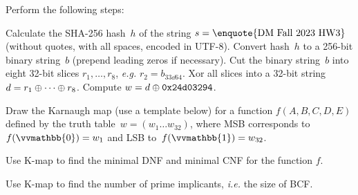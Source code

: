 \documentclass[a4paper,12pt]{article}
\begin{document}

\begin{tasks}
    \item Perform the following steps:
    \begin{subtasks}
        \item Calculate the SHA-256 hash~$h$ of the string $s = \text{\enquote{DM Fall 2023 HW3}}$ (without quotes, with all spaces, encoded in UTF-8).
        Convert hash~$h$ to a 256-bit binary string~$b$ (prepend leading zeros if necessary).
        Cut the binary string~$b$ into eight 32-bit slices $r_1, \dotsc, r_8$, \textit{e.g.} $r_2 = b_{33 \dd 64}$.
        Xor all slices into a 32-bit string $d = r_1 \oplus \dotsb \oplus r_8$.
        Compute $w = d \oplus \mathtt{0x24d03294}$.

        \item Draw the Karnaugh map (use a template below) for a function $f(A,B,C,D,E)$ defined by the truth table~$w = (w_{1} \dots w_{32})$, where MSB corresponds to~$f(\vvmathbb{0}) = w_{1}$ and LSB to~$f(\vvmathbb{1}) = w_{32}$.

        \item Use K-map to find the minimal DNF and minimal CNF for the function $f$.

        \item Use K-map to find the number of prime implicants, \textit{i.e.} the size of BCF\@.

\end{subtasks}
\end{tasks}
\end{document}
